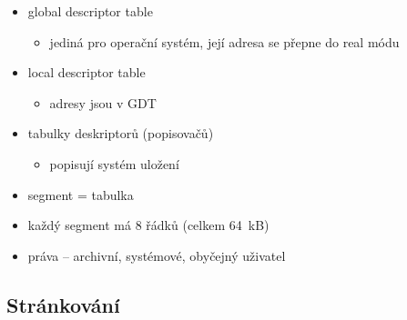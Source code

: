 \documentclass[a4paper,12pt]{article}
\providecommand{\tightlist}{%
\setlength{\itemsep}{0pt}\setlength{\parskip}{0pt}}
\begin{document}
\begin{itemize}
\tightlist
\item global descriptor table

  \begin{itemize}
  \tightlist
  \item jediná pro operační systém, její adresa se přepne do real módu
  \end{itemize}
\item local descriptor table

  \begin{itemize}
  \tightlist
  \item adresy jsou v GDT
  \end{itemize}
\item tabulky deskriptorů (popisovačů)

  \begin{itemize}
  \tightlist
  \item popisují systém uložení
  \end{itemize}
\item segment = tabulka
\item každý segment má 8 řádků (celkem 64~kB)
\item práva -- archivní, systémové, obyčejný uživatel
\end{itemize}

\subsection{Stránkování}
\end{document}
